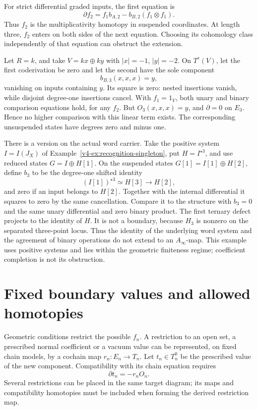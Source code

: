 For strict differential graded inputs, the first equation is
\[
 \partial f_2
   =f_1b_{A,2}-b_{B,2}(f_1\otimes f_1).
\]
Thus \(f_2\) is the multiplicativity homotopy in suspended
coordinates. At length three, \(f_2\) enters on both sides of
the next equation. Choosing its cohomology class independently
of that equation can obstruct the extension.

\begin{example}
\label{v4-ex:recognition-minimal-ternary}
Let \(R=k\), and take \(V=kx\oplus ky\) with
\(|x|=-1\), \(|y|=-2\). On \(T^c(V)\), let the first
coderivation be zero and let the second have the sole component
\[
 b_{B,3}(x,x,x)=y,
\]
vanishing on inputs containing \(y\). Its square is zero:
nested insertions vanish, while disjoint degree-one insertions
cancel. With \(f_1=1_V\), both unary and binary comparison
equations hold, for any \(f_2\). But \(O_3(x,x,x)=y\),
and \(\partial=0\) on \(E_3\). Hence no higher comparison
with this linear term exists. The corresponding unsuspended
states have degrees zero and minus one.
\end{example}

There is a version on the actual word carrier. Take the positive
system \(I=I(J_X)\) of
Example~\ref{v4-ex:recognition-singleton}, put \(H=I^{\star3}\),
and use reduced states \(G=I\oplus H[1]\). On the suspended
states \(G[1]=I[1]\oplus H[2]\), define \(b_3\) to be the
degree-one shifted identity
\[
 (I[1])^{\star3}\simeq H[3]\longrightarrow H[2],
\]
and zero if an input belongs to \(H[2]\). Together with the
internal differential it squares to zero by the same cancellation.
Compare it to the structure with \(b_3=0\) and the same unary
differential and zero binary product. The first ternary defect
projects to the identity of \(H\). It is not a boundary, because
\(H_3\) is nonzero on the separated three-point locus. Thus
the identity of the underlying word system and the agreement of
binary operations do not extend to an \(A_\infty\)-map. This
example uses positive systems and lies within the geometric
finiteness regime; coefficient completion is not its obstruction.

\section{Fixed boundary values and allowed homotopies}
\label{v4-sec:recognition-relative-complex}

Geometric conditions restrict the possible \(f_n\). A
restriction to an open set, a prescribed normal coefficient or
a vacuum value can be represented, on fixed chain models, by a
cochain map
\(r_n:E_n\to T_n\). Let \(t_n\in T_n^0\) be the
prescribed value of the new component. Compatibility with its
chain equation requires
\[
 \partial t_n=-r_nO_n.
\]
Several restrictions can be placed in the same target diagram;
its maps and compatibility homotopies must be included when
forming the derived restriction map.

